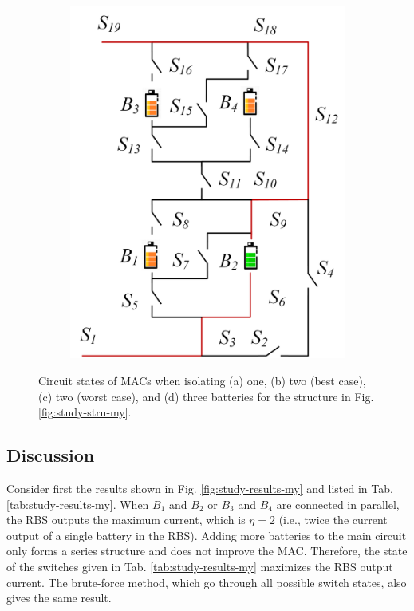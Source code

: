 \documentclass{article}
\begin{document}
\begin{figure}[htbp]
\begin{subfigure}[b]{0.31\textwidth}
          \includegraphics[width=\textwidth]{my-isolated-3.png}
          \caption{}
          \label{fig:my-isolated-3}
      \end{subfigure}
      \caption{
          Circuit states of MACs when isolating (a) one, (b) two (best case), (c) two (worst case), and (d) three batteries for the structure in Fig. \ref{fig:study-stru-my}.
          }
  \end{figure}

\subsection{Discussion}

Consider first the results shown in Fig. \ref{fig:study-results-my} and listed in Tab. \ref{tab:study-results-my}.
When $B_1$ and $B_2$ or $B_3$ and $B_4$ are connected in parallel, the RBS outputs the maximum current, which is $\eta=2$ (i.e., twice the current output of a single battery in the RBS). 
Adding more batteries to the main circuit only forms a series structure and does not improve the MAC. 
Therefore, the state of the switches given in Tab. \ref{tab:study-results-my} maximizes the RBS output current.
The brute-force method, which go through all possible switch states, also gives the same result.
\end{document}
